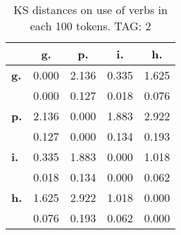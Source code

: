 \begin{table}[h!]
\begin{center}
\begin{tabular}{| l || c | c | c | c |}\hline
 & {\bf g.} & {\bf p.} & {\bf i.} & {\bf h.} \\\hline\hline
{\bf g.} & 0.000 & 2.136 & 0.335 & 1.625 \\
{\bf } & 0.000 & 0.127 & 0.018 & 0.076 \\\hline
{\bf p.} & 2.136 & 0.000 & 1.883 & 2.922 \\
{\bf } & 0.127 & 0.000 & 0.134 & 0.193 \\\hline
{\bf i.} & 0.335 & 1.883 & 0.000 & 1.018 \\
{\bf } & 0.018 & 0.134 & 0.000 & 0.062 \\\hline
{\bf h.} & 1.625 & 2.922 & 1.018 & 0.000 \\
{\bf } & 0.076 & 0.193 & 0.062 & 0.000 \\\hline
\end{tabular}
\caption{KS distances on use of verbs in each 100 tokens. TAG: 2}
\end{center}
\end{table}